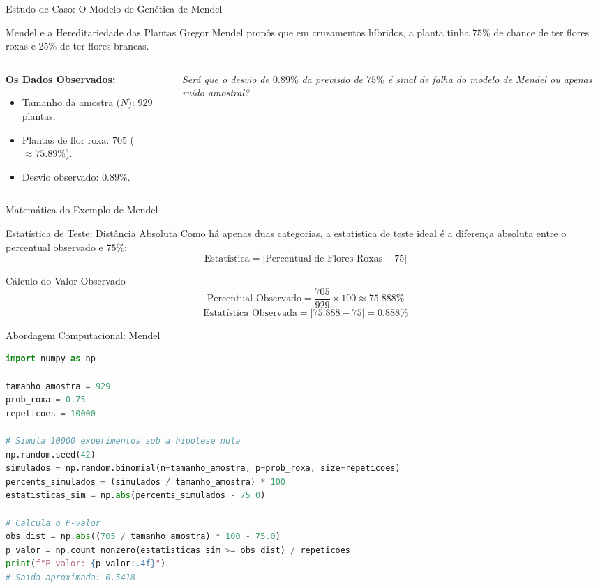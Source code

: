 \begin{frame}{Estudo de Caso: O Modelo de Genética de Mendel}
    \begin{block}{Mendel e a Hereditariedade das Plantas}
        Gregor Mendel propôs que em cruzamentos híbridos, a planta tinha $75\%$ de chance de ter flores roxas e $25\%$ de ter flores brancas.
    \end{block}
    \begin{columns}
        \begin{column}{0.5\textwidth}
            \textbf{Os Dados Observados:}
            \begin{itemize}
                \item Tamanho da amostra ($N$): $929$ plantas.
                \item Plantas de flor roxa: $705$ ($\approx 75.89\%$).
                \item Desvio observado: $0.89\%$.
            \end{itemize}
        \end{column}
        \begin{column}{0.5\textwidth}
            \centering
            \textit{Será que o desvio de $0.89\%$ da previsão de $75\%$ é sinal de falha do modelo de Mendel ou apenas ruído amostral?}
        \end{column}
    \end{columns}
\end{frame}

\begin{frame}{Matemática do Exemplo de Mendel}
    \begin{block}{Estatística de Teste: Distância Absoluta}
        Como há apenas duas categorias, a estatística de teste ideal é a diferença absoluta entre o percentual observado e $75\%$:
        $$\text{Estatística} = \left| \text{Percentual de Flores Roxas} - 75 \right|$$
    \end{block}
    \begin{block}{Cálculo do Valor Observado}
        $$\text{Percentual Observado} = \frac{705}{929} \times 100 \approx 75.888\%$$
        $$\text{Estatística Observada} = \left| 75.888 - 75 \right| = 0.888\%$$
    \end{block}
\end{frame}

\begin{frame}[fragile]{Abordagem Computacional: Mendel}
\begin{lstlisting}[language=Python]
import numpy as np

tamanho_amostra = 929
prob_roxa = 0.75
repeticoes = 10000

# Simula 10000 experimentos sob a hipotese nula
np.random.seed(42)
simulados = np.random.binomial(n=tamanho_amostra, p=prob_roxa, size=repeticoes)
percents_simulados = (simulados / tamanho_amostra) * 100
estatisticas_sim = np.abs(percents_simulados - 75.0)

# Calcula o P-valor
obs_dist = np.abs((705 / tamanho_amostra) * 100 - 75.0)
p_valor = np.count_nonzero(estatisticas_sim >= obs_dist) / repeticoes
print(f"P-valor: {p_valor:.4f}")
# Saida aproximada: 0.5418
\end{lstlisting}
\end{frame}

